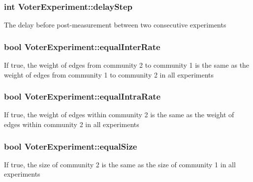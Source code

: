 \subsubsection[{delay\+Step}]{\setlength{\rightskip}{0pt plus 5cm}int Voter\+Experiment\+::delay\+Step}\label{class_voter_experiment_a1c95cd8bdfefbcb1c51560f2b9fc5b85}
The delay before post-\/measurement between two consecutive experiments \hypertarget{class_voter_experiment_a95947b09a90a06bbf9246a0c89779411}{}
\subsubsection[{equal\+Inter\+Rate}]{\setlength{\rightskip}{0pt plus 5cm}bool Voter\+Experiment\+::equal\+Inter\+Rate}\label{class_voter_experiment_a95947b09a90a06bbf9246a0c89779411}
If true, the weight of edges from community 2 to community 1 is the same as the weight of edges from community 1 to community 2 in all experiments \hypertarget{class_voter_experiment_a7f84a77316202aad327b2aa2cf16829c}{}
\subsubsection[{equal\+Intra\+Rate}]{\setlength{\rightskip}{0pt plus 5cm}bool Voter\+Experiment\+::equal\+Intra\+Rate}\label{class_voter_experiment_a7f84a77316202aad327b2aa2cf16829c}
If true, the weight of edges within community 2 is the same as the weight of edges within community 2 in all experiments \hypertarget{class_voter_experiment_accbcfbfc5929ac118cda138f5cf9f702}{}
\subsubsection[{equal\+Size}]{\setlength{\rightskip}{0pt plus 5cm}bool Voter\+Experiment\+::equal\+Size}\label{class_voter_experiment_accbcfbfc5929ac118cda138f5cf9f702}
If true, the size of community 2 is the same as the size of community 1 in all experiments \hypertarget{class_voter_experiment_a013f931e0562435c97530c8a4be7042e}{}
